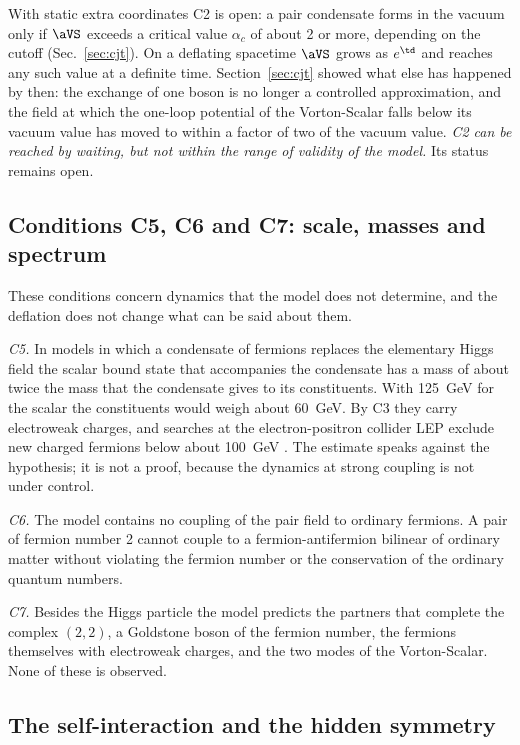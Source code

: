 With static extra coordinates C2 is open: a pair condensate forms in the vacuum only if $\aVS$
exceeds a critical value $\alpha_c$ of about 2 or more, depending on the cutoff (Sec.~\ref{sec:cjt}). On a deflating spacetime
$\aVS$ grows as $e^{\td}$ and reaches any such value at a definite time. Section~\ref{sec:cjt} showed
what else has happened by then: the exchange of one boson is no longer a controlled approximation,
and the field at which the one-loop potential of the Vorton-Scalar falls below its vacuum value has
moved to within a factor of two of the vacuum value. \emph{C2 can be reached by waiting, but not
within the range of validity of the model.} Its status remains open.

\subsection{Conditions C5, C6 and C7: scale, masses and spectrum}
\label{sec:c567}

These conditions concern dynamics that the model does not determine, and the deflation does not
change what can be said about them.

\emph{C5.} In models in which a condensate of fermions replaces the elementary Higgs field
\cite{NJL1961,BardeenHillLindner1990} the scalar bound state that accompanies the condensate has a
mass of about twice the mass that the condensate gives to its constituents. With 125~GeV for the
scalar the constituents would weigh about 60~GeV. By C3 they carry electroweak charges, and
searches at the electron-positron collider LEP exclude new charged fermions below about 100~GeV
\cite{PDG2024}. The estimate speaks against the hypothesis; it is not a proof, because the dynamics
at strong coupling is not under control.

\emph{C6.} The model contains no coupling of the pair field to ordinary fermions. A pair of fermion
number 2 cannot couple to a fermion-antifermion bilinear of ordinary matter without violating the
fermion number or the conservation of the ordinary quantum numbers.

\emph{C7.} Besides the Higgs particle the model predicts the partners that complete the complex
$(2,2)$, a Goldstone boson of the fermion number, the fermions themselves with electroweak charges,
and the two modes of the Vorton-Scalar. None of these is observed.

\subsection{The self-interaction and the hidden symmetry}
\label{sec:higgsself}

